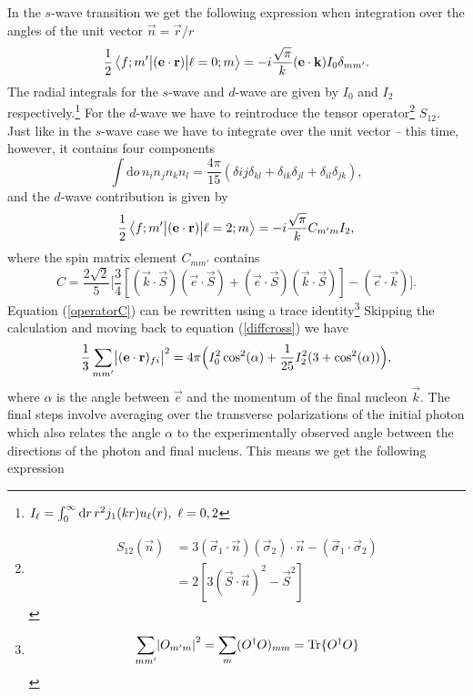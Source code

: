 In the $s$-wave transition we get the following expression when integration over the angles of the unit vector $\vec{n}=\vec{r}/r$
\begin{equation}
    \frac{1}{2}\mel{f;m'}{(\bm{\mathrm{e}}\cdot\bm{\mathrm{r}})}{\ell=0;m} = -i\frac{\sqrt{\pi}}{k} (\bm{\mathrm{e}}\cdot\bm{\mathrm{k}} )I_0 \delta_{mm'}.
\end{equation}
The radial integrals for the $s$-wave and $d$-wave are given by $I_0$ and $I_2$ respectively.\footnote{$I_\ell = \int_0^\infty \textrm{d}r \, r^2 j_1(kr)u_\ell(r), \\ \, \, \ell=0,2$}
For the $d$-wave we have to reintroduce the tensor operator\footnote{\begin{align*}
    S_{12}(\vec{n})&=3(\vec{\sigma}_1\cdot \vec{n})(\vec{\sigma}_2)\cdot\vec{n}-(\vec{\sigma}_1\cdot\vec{\sigma}_2) \\
    &= 2[3(\vec{S}\cdot\vec{n})^2-\vec{S}^2]
\end{align*}} $S_12$. Just like in the $s$-wave case we have to integrate over the unit vector -- this time, however, it contains four components
\begin{equation}
    \int \textrm{d}o \, n_i n_j n_k n_l = \frac{4\pi}{15}(\delta{ij}\delta_{kl}+\delta_{ik}\delta_{jl}+\delta_{il}\delta_{jk}),
\end{equation}
and the $d$-wave contribution is given by
\begin{equation}
    \frac{1}{2}\mel{f;m'}{(\bm{\mathrm{e}}\cdot \bm{\mathrm{r}})}{\ell=2;m} = -i\frac{\sqrt{\pi}}{k}C_{m'm}I_2,
\end{equation}
where the spin matrix element $C_{mm'}$ contains
\begin{equation}\label{operatorC}
    C= \frac{2\sqrt{2}}{5} \Big[ \frac{3}{4}\left[ (\vec{k}\cdot \vec{S})(\vec{e}\cdot \vec{S})+(\vec{e}\cdot \vec{S})(\vec{k}\cdot \vec{S})\right] -(\vec{e}\cdot \vec{k}) \Big].
\end{equation}
Equation (\ref{operatorC}) can be rewritten using a trace identity\footnote{\begin{align*}
    \sum_{mm'}\abs{O_{m'm}}^2=\sum_m (O^\dagger O)_{mm} = \text{Tr}\{ O^\dagger O \}
\end{align*}}
Skipping the calculation and moving back to equation (\ref{diffcross}) we have
\begin{equation}
    \frac{1}{3} \sum_{mm'} \abs{(\bm{\mathrm{e}}\cdot \bm{\mathrm{r}})_{fi}}^2 = 4\pi \Big(I_0^2\cos^2(\alpha) + \frac{1}{25}I_2^2(3+\cos^2(\alpha)) \Big),
\end{equation}
where $\alpha$ is the angle between $\vec{e}$ and the momentum of the final nucleon $\vec{k}$. The final steps involve averaging over the transverse polarizations of the initial photon which also relates the angle $\alpha$ to the experimentally observed angle between the directions of the photon and final nucleus. This means we get the following expression
